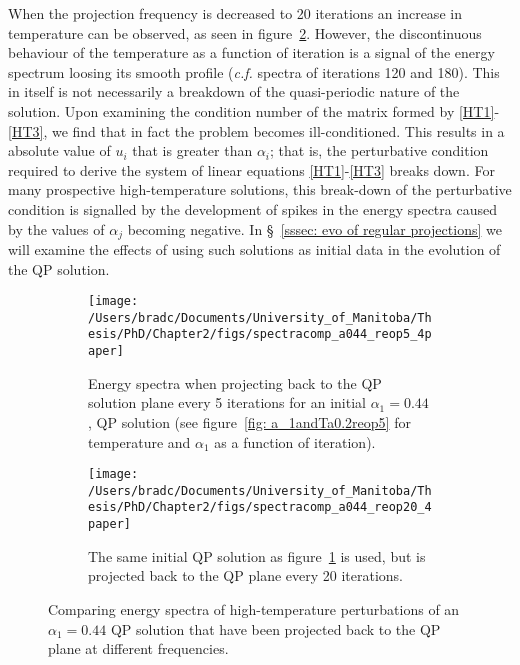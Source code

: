 \documentclass[../PhD.tex]{subfiles}
\begin{document}
When the projection frequency is decreased to 20 iterations an increase in temperature can be observed, as seen in figure~\ref{fig: spec comparisons reop20}. However, the discontinuous behaviour of the temperature as a function of iteration is a signal of the energy spectrum loosing its smooth profile ({\it c.f.} spectra of iterations 120 and 180). This in itself is not necessarily a breakdown of the quasi-periodic nature of the solution. Upon examining the condition number of the matrix formed by \eqref{HT1}-\eqref{HT3}, we find that in fact the problem becomes ill-conditioned. This results in a absolute value of $u_i$ that is greater than $\alpha_i$; that is, the perturbative condition required to derive the system of linear equations \eqref{HT1}-\eqref{HT3} breaks down. For many prospective high-temperature solutions, this break-down of the perturbative condition is signalled by the development of spikes in the energy spectra caused by the values of $\alpha_j$ becoming negative. In \S~\ref{sssec: evo of regular projections} we will examine the effects of using such solutions as initial data in the evolution of the QP solution.

\begin{figure}[h]
	\centering
	\begin{subfigure}[t]{0.45\textwidth}
		\texttt{[image: /Users/bradc/Documents/University\_of\_Manitoba/Thesis/PhD/Chapter2/figs/spectracomp\_a044\_reop5\_4paper]}
		\caption{Energy spectra when projecting back to the QP solution plane every 5 iterations for an initial $\alpha_1 = 0.44$, QP solution (see figure~\ref{fig: a_1andTa0.2reop5} for temperature and $\alpha_1$ as a function of iteration).}
		\label{fig: spec comparisons reop5}
	\end{subfigure}
	\:
	\begin{subfigure}[t]{0.45\textwidth}
		\texttt{[image: /Users/bradc/Documents/University\_of\_Manitoba/Thesis/PhD/Chapter2/figs/spectracomp\_a044\_reop20\_4paper]}
		\caption{The same initial QP solution as figure~\ref{fig: spec comparisons reop5} is used, but is projected back to the QP plane every 20 iterations.}
		\label{fig: spec comparisons reop20}
	\end{subfigure}
	\caption{Comparing energy spectra of high-temperature perturbations of an $\alpha_1=0.44$ QP solution that have been projected back to the QP plane at different frequencies.}
	\label{fig: spec comps with reop}
\end{figure}


\end{document}
